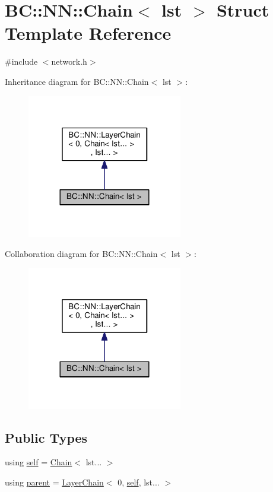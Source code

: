 \hypertarget{structBC_1_1NN_1_1Chain}{}\section{BC\+:\+:NN\+:\+:Chain$<$ lst $>$ Struct Template Reference}
\label{structBC_1_1NN_1_1Chain}


{\ttfamily \#include $<$network.\+h$>$}



Inheritance diagram for BC\+:\+:NN\+:\+:Chain$<$ lst $>$\+:
\nopagebreak
\begin{figure}[H]
\begin{center}
\leavevmode
\includegraphics[width=192pt]{structBC_1_1NN_1_1Chain__inherit__graph}
\end{center}
\end{figure}


Collaboration diagram for BC\+:\+:NN\+:\+:Chain$<$ lst $>$\+:
\nopagebreak
\begin{figure}[H]
\begin{center}
\leavevmode
\includegraphics[width=192pt]{structBC_1_1NN_1_1Chain__coll__graph}
\end{center}
\end{figure}
\subsection*{Public Types}
\begin{DoxyCompactItemize}
\item 
using \hyperlink{structBC_1_1NN_1_1Chain_a0b49e7c4d6ebb165c42d8d5d8413cfd6}{self} = \hyperlink{structBC_1_1NN_1_1Chain}{Chain}$<$ lst... $>$
\item 
using \hyperlink{structBC_1_1NN_1_1Chain_a32de6795ede484f33f461e161a8ab785}{parent} = \hyperlink{structBC_1_1NN_1_1LayerChain}{Layer\+Chain}$<$ 0, \hyperlink{structBC_1_1NN_1_1Chain_a0b49e7c4d6ebb165c42d8d5d8413cfd6}{self}, lst... $>$
\end{DoxyCompactItemize}
